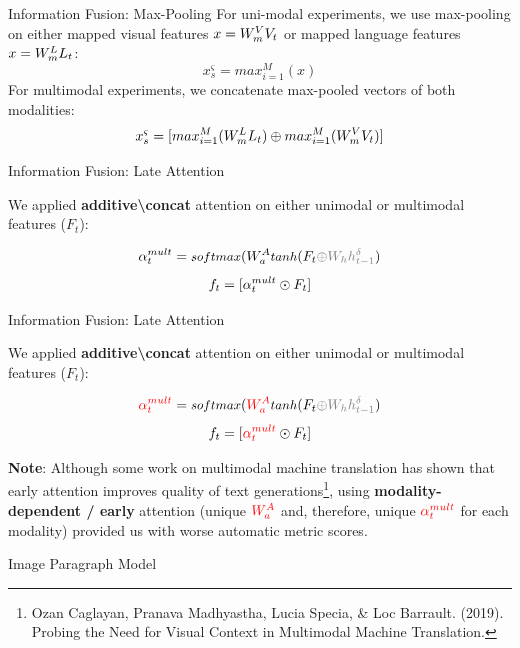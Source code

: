 \documentclass[notes=hide]{beamer}
\begin{document}
\begin{frame}{Information Fusion: Max-Pooling}
For uni-modal experiments, we use max-pooling on either mapped visual features $x=W_{m}\sp{V} V_t$ or mapped language features $x=W_{m}\sp{L} L_t$:
\begin{equation}
x^\varsigma_s = max_{i=1}^M(x)
\end{equation}
\pause
For multimodal experiments, we concatenate max-pooled vectors of both modalities:
\begin{equation}
x^\varsigma_s = [max_{i=1}^M(W_{m}\sp{L} L_t) \oplus max_{i=1}^M(W_{m}\sp{V} V_t)]
\end{equation}
\end{frame}

\begin{frame}{Information Fusion: Late Attention}

We applied \textbf{additive\textbackslash concat} attention on either unimodal or multimodal features ($F_t$):

\begin{equation}
\alpha_t\sp{mult} = \text{\small $softmax$}(W_a\sp{A} \text{\small $tanh$} (F_t\textcolor{gray}{\oplus W_h h\sp{\delta}_{t-1}})
\end{equation}
\begin{equation}
	f_t = [\alpha_t\sp{mult} \odot F_t ]
\end{equation}
\end{frame}

\begin{frame}{Information Fusion: Late Attention}

We applied \textbf{additive\textbackslash concat} attention on either unimodal or multimodal features ($F_t$):

\begin{equation}
\textcolor{red}{ \alpha_t\sp{mult}} = \text{\small $softmax$}( \textcolor{red}{W_a\sp{A}} \text{\small $tanh$} (F_t\textcolor{gray}{\oplus W_h h\sp{\delta}_{t-1}})
\end{equation}
\begin{equation}
	f_t = [ \textcolor{red}{\alpha_t\sp{mult}} \odot F_t ]
\end{equation}

{\vspace{.5cm}\textbf{Note}: Although some work on multimodal machine translation has shown that early attention improves quality of text generations\footnote{Ozan Caglayan, Pranava Madhyastha, Lucia Specia, \& Loc Barrault. (2019). Probing the Need for Visual Context in Multimodal Machine Translation.}, using \textbf{modality-dependent / early} attention (unique $\textcolor{red}{W_a\sp{A}}$ and, therefore, unique $\textcolor{red}{ \alpha_t\sp{mult}}$ for each modality) provided us with worse automatic metric scores.}

\end{frame}


\begin{frame}{Image Paragraph Model}

\end{frame}
\end{document}
